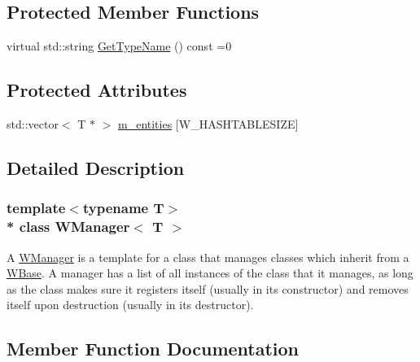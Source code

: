 \subsection*{Protected Member Functions}
\begin{DoxyCompactItemize}
\item 
virtual std\+::string \hyperlink{class_w_manager_a85a6c2f77d8b477358b58948325e0298}{Get\+Type\+Name} () const  =0
\end{DoxyCompactItemize}
\subsection*{Protected Attributes}
\begin{DoxyCompactItemize}
\item 
std\+::vector$<$ T $\ast$ $>$ \hyperlink{class_w_manager_aad7041fe4813ac2bee7bb8380ed02b68}{m\+\_\+entities} \mbox{[}W\+\_\+\+H\+A\+S\+H\+T\+A\+B\+L\+E\+S\+I\+ZE\mbox{]}
\end{DoxyCompactItemize}


\subsection{Detailed Description}
\subsubsection*{template$<$typename T$>$\\*
class W\+Manager$<$ T $>$}

A \hyperlink{class_w_manager}{W\+Manager} is a template for a class that manages classes which inherit from a \hyperlink{class_w_base}{W\+Base}. A manager has a list of all instances of the class that it manages, as long as the class makes sure it registers itself (usually in its constructor) and removes itself upon destruction (usually in its destructor). 

\subsection{Member Function Documentation}

